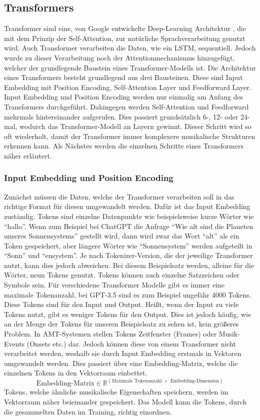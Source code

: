 \subsection{Transformers}
Transformer sind eine, von Google entwickelte Deep-Learning Architektur \cite{vaswani2017attention},
die mit dem Prinzip der Self-Attention, zur natürliche Sprachverarbeitung genutzt wird.
Auch Transformer verarbeiten die Daten, wie ein LSTM, sequentiell.
Jedoch wurde zu dieser Verarbeitung noch der Attentionmechanismus hinzugefügt,
welcher der grundlegende Baustein eines Transformer-Modells ist.
Die Architektur eines Transformers besteht grundlegend aus drei Bausteinen.
Diese sind Input Embedding mit Position Encoding, Self-Attention Layer und Feedforward Layer.
Input Embedding und Position Encoding werden nur einmalig am Anfang des Transformers durchgeführt.
Dahingegen werden Self-Attention und Feedforward mehrmals hintereinander aufgerufen.
Dies passiert grundsätzlich 6-, 12- oder 24-mal, wodurch das Transformer-Modell an Layern gewinnt.
Dieser Schritt wird so oft wiederholt, damit der Transformer immer komplexere musikalische Strukturen erkennen kann.
Als Nächstes werden die einzelnen Schritte eines Transformers näher erläutert.

\subsubsection{Input Embedding und Position Encoding}
Zunächst müssen die Daten, welche der Transformer verarbeiten soll in das richtige Format für diesen umgewandelt werden.
Dafür ist das Input Embedding zuständig.
Tokens sind einzelne Datenpunkte wie beispielsweise kurze Wörter wie \enquote{hallo}.
Wenn zum Beispiel bei ChatGPT die Anfrage \enquote{Wie alt sind die Planeten unseres Sonnensystems} gestellt wird,
dann wird zwar das Wort \enquote{alt} als ein Token gespeichert, aber längere Wörter wie \enquote{Sonnensystem}
werden aufgeteilt in \enquote{Sonn} und \enquote{ensystem}.
Je nach Tokenizer-Version, die der jeweilige Transformer nutzt, kann dies jedoch abweichen.
Bei diesem Beispielsatz werden, alleine für die Wörter, neun Tokens genutzt.
Tokens können auch einzelne Satzzeichen oder Symbole sein.
Für verschiedene Transformer Modelle gibt es immer eine maximale Tokenanzahl,
bei GPT-3.5 sind es zum Beispiel ungefähr 4000 Tokens.
Diese Tokens sind für den Input und Output.
Heißt, wenn der Input zu viele Tokens nutzt, gibt es weniger Tokens für den Output.
Dies ist jedoch häufig, wie an der Menge der Tokens für unseren Beispielsatz zu sehen ist, kein größeres Problem.
In AMT-Systemen stellen Tokens Zeitfenster (Frames) oder Musik-Events (Onsets etc.) dar.
Jedoch können diese von einem Transformer nicht verarbeitet werden,
weshalb sie durch Input Embedding erstmals in Vektoren umgewandelt werden.
Dies passiert über eine Embedding-Matrix, welche die einzelnen Tokens in den Vektorraum einbettet.
\[
\displaystyle
\text{Embedding-Matrix} \in \mathbb{R}^{\left( \text{Maximale Tokenanzahl } \times \text{ Embedding-Dimension} \right)}
\]
Tokens, welche ähnliche musikalische Eigenschaften speichern, werden im Vektorraum näher beieinander gespeichert.
Das Modell kann die Tokens, durch die gesammelten Daten im Training, richtig einordnen.

